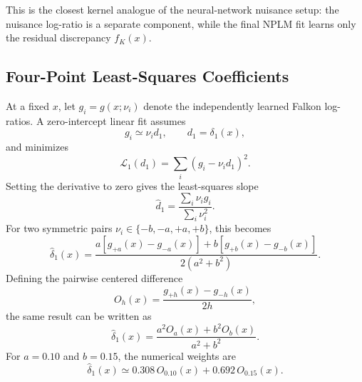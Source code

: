 \documentclass[11pt]{article}
\begin{document}
This is the closest kernel analogue of the neural-network nuisance setup:
the nuisance log-ratio is a separate component, while the final NPLM fit learns
only the residual discrepancy $f_K(x)$.

\subsection{Four-Point Least-Squares Coefficients}

At a fixed $x$, let $g_i=g(x;\nu_i)$ denote the independently learned Falkon
log-ratios. A zero-intercept linear fit assumes
\begin{equation}
  g_i \simeq \nu_i d_1,
  \qquad d_1=\delta_1(x),
\end{equation}
and minimizes
\begin{equation}
  \mathcal{L}_1(d_1)=\sum_i (g_i-\nu_i d_1)^2.
\end{equation}
Setting the derivative to zero gives the least-squares slope
\begin{equation}
  \widehat{d}_1
  =\frac{\sum_i \nu_i g_i}{\sum_i \nu_i^2}.
\end{equation}
For two symmetric pairs $\nu_i\in\{-b,-a,+a,+b\}$, this becomes
\begin{equation}
  \widehat{\delta}_1(x)
  =
  \frac{
    a[g_{+a}(x)-g_{-a}(x)]
    +b[g_{+b}(x)-g_{-b}(x)]
  }{2(a^2+b^2)}.
\end{equation}
Defining the pairwise centered difference
\begin{equation}
  O_h(x)=\frac{g_{+h}(x)-g_{-h}(x)}{2h},
\end{equation}
the same result can be written as
\begin{equation}
  \widehat{\delta}_1(x)
  =\frac{a^2 O_a(x)+b^2 O_b(x)}{a^2+b^2}.
\end{equation}
For $a=0.10$ and $b=0.15$, the numerical weights are
\begin{equation}
  \widehat{\delta}_1(x)
  \simeq 0.308\,O_{0.10}(x)+0.692\,O_{0.15}(x).
\end{equation}
\end{document}
